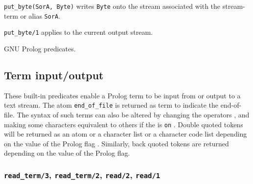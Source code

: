 \Description

\texttt{put\_byte(SorA, Byte)} writes \texttt{Byte} onto the stream
associated with the stream-term or alias \texttt{SorA}. 

\texttt{put\_byte/1} applies to the current output stream.

\begin{PlErrors}








\end{PlErrors}

\Portability

GNU Prolog predicates.

\subsection{Term input/output}
\label{Term-input/output}
These built-in predicates enable a Prolog term to be input from or output to
a text stream. The atom \texttt{end\_of\_file} is returned as term to
indicate the end-of-file. The syntax of such terms can also be altered by
changing the operators , and making some
characters equivalent to others  if the
  is \texttt{on}
. Double quoted tokens will be returned as an atom
or a character list or a character code list depending on the value of the
 Prolog flag . Similarly, back quoted tokens are returned depending on the value of the
 Prolog flag.

\subsubsection{\texttt{read\_term/3},
               \texttt{read\_term/2},
               \texttt{read/2},
               \texttt{read/1}}
\label{read-term/3}

